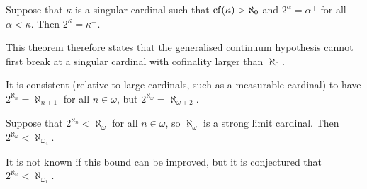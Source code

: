 \begin{theorem}[Silver]
    Suppose that \( \kappa \) is a singular cardinal such that \( \operatorname{cf}(\kappa) > \aleph_0 \) and \( 2^\alpha = \alpha^+ \) for all \( \alpha < \kappa \).
    Then \( 2^\kappa = \kappa^+ \).
\end{theorem}
This theorem therefore states that the generalised continuum hypothesis cannot first break at a singular cardinal with cofinality larger than \( \aleph_0 \).
\begin{remark}
    It is consistent (relative to large cardinals, such as a measurable cardinal) to have \( 2^{\aleph_n} = \aleph_{n + 1} \) for all \( n \in \omega \), but \( 2^{\aleph_\omega} = \aleph_{\omega + 2} \).
\end{remark}
\begin{theorem}[Shelah]
    Suppose that \( 2^{\aleph_n} < \aleph_\omega \) for all \( n \in \omega \), so \( \aleph_\omega \) is a strong limit cardinal.
    Then \( 2^{\aleph_\omega} < \aleph_{\omega_4} \).
\end{theorem}
It is not known if this bound can be improved, but it is conjectured that \( 2^{\aleph_\omega} < \aleph_{\omega_1} \).
